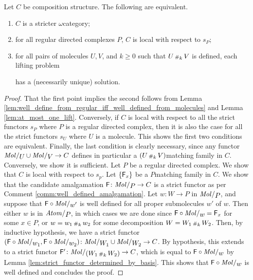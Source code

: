 \begin{lem} \label{lem:stricter_iff_local_wrt_pasting}
    Let \( C \) be composition structure.
    The following are equivalent.
    \begin{enumerate}
        \item \( C \) is a stricter \( \omega \)\nbd category;
        \item for all regular directed complexes \( P \), \( C \) is local with respect to \( s_P \);
        \item for all pairs of molecules \( U, V \), and \( k \geq 0 \) such that \( U \,{\scriptstyle\#}_{k}\, V \) is defined, each lifting problem
        \begin{center}
        \end{center}
        has a (necessarily unique) solution.
    \end{enumerate}
\end{lem}
\begin{proof}
    That the first point implies the second follows from Lemma \ref{lem:well_define_from_regular_iff_well_defined_from_molecules} and Lemma \ref{lem:at_most_one_lift}.
    Conversely, if \( C \) is local with respect to all the strict functors \( s_P \) where \( P \) is a regular directed complex, then it is also the case for all the strict functors \( s_U \) where \( U \) is a molecule.
    This shows the first two conditions are equivalent.
    Finally, the last condition is clearly necessary, since any functor \( \molecin{U} \cup \molecin{V} \to C \) defines in particular a \( (U \,{\scriptstyle\#}_{k}\, V) \)\nbd matching family in \( C \).
    Conversely, we show it is sufficient.
    Let \( P \) be a regular directed complex.
    We show that \( C \) is local with respect to \( s_p \).
    Let \( \left\{ {\mathsf{F}_x} \right\} \) be a \( P \)\nbd matching family in \( C \).
    We show that the candidate amalgamation \( \F \colon \molecin{P} \to C \) is a strict functor as per Comment \ref{comm:well_defined_amalgamation}.
    Let \( w \colon W \to P \) in \( \molecin{P} \), and suppose that \( \F \after \molecin{w'} \) is well defined for all proper submolecules \( w' \) of \( w \).
    Then either \( w \) is in \( \atomin{P} \), in which cases we are done since \( \F \after \molecin{w} = \F_x \) for some \( x \in P \), or \( w = w_1 \,{\scriptstyle\#}_{k}\, w_2 \) for some decomposition \( W = W_1 \,{\scriptstyle\#}_{k}\, W_2 \).
    Then, by inductive hypothesis, we have a strict functor \( (\F \after \molecin{w_1}, \F \after \molecin{w_2}) \colon \molecin{W_1} \cup \molecin{W_2} \to C \).
    By hypothesis, this extends to a strict functor \( \F' \colon \molecin{(W_1 \cp{k} W_2)} \to C \), which is equal to \( \F \after \molecin{w} \) by Lemma \ref{lem:strict_functor_determined_by_basis}.
    This shows that \( \F \after \molecin{w} \) is well defined and concludes the proof.
\end{proof}

